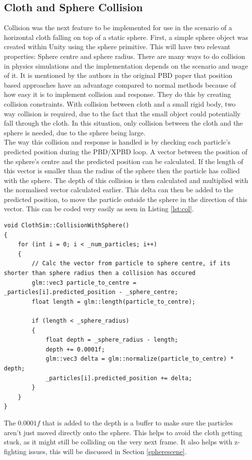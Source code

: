 \documentclass[12pt,a4paper]{article}
\begin{document}
\subsection{Cloth and Sphere Collision}
\label{collision}
Collision was the next feature to be implemented for use in the scenario of a horizontal cloth falling on top of a static sphere. First, a simple sphere object was created within Unity using the sphere primitive. This will have two relevant properties: Sphere centre and sphere radius. There are many ways to do collision in physics simulations and the implementation depends on the scenario and usage of it. It is mentioned by the authors in the original PBD paper that position based approaches have an advantage compared to normal methods because of how easy it is to implement collision and response. They do this by creating collision constraints. With collision between cloth and a small rigid body, two way collision is required, due to the fact that the small object could potentially fall through the cloth. In this situation, only collision between the cloth and the sphere is needed, due to the sphere being large. \\

The way this collision and response is handled is by checking each particle's predicted position during the PBD/XPBD loop. A vector between the position of the sphere's centre and the predicted position can be calculated. If the length of this vector is smaller than the radius of the sphere then the particle has collied with the sphere. The depth of this collision is then calculated and multiplied with the normalised vector calculated earlier. This delta can then be added to the predicted position, to move the particle outside the sphere in the direction of this vector. This can be coded very easily as seen in Listing \ref{lst:col}. 
\begin{lstlisting}[caption={Sphere collision function},label={lst:col}]
void ClothSim::CollisionWithSphere()
{
	for (int i = 0; i < _num_particles; i++)
	{
		// Calc the vector from particle to sphere centre, if its shorter than sphere radius then a collision has occured
		glm::vec3 particle_to_centre = _particles[i].predicted_position - _sphere_centre;
		float length = glm::length(particle_to_centre);
		
		if (length < _sphere_radius)
		{
			float depth = _sphere_radius - length;
			depth += 0.0001f;
			glm::vec3 delta = glm::normalize(particle_to_centre) * depth;
			_particles[i].predicted_position += delta;
		}
	}
}

\end{lstlisting}
The $0.0001f$ that is added to the depth is a buffer to make sure the particles aren't just moved directly onto the sphere. This helps to avoid the cloth getting stuck, as it might still be colliding on the very next frame. It also helps with z-fighting issues, this will be discussed in Section \ref{spherescene}.
\end{document}
